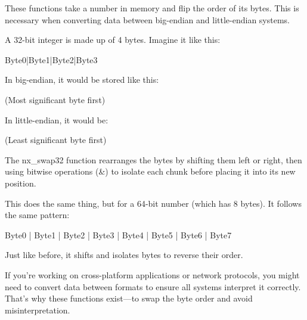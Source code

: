 \begin{NexMainBox}
	\begin{NexMainBox}[dark, crnA, title=\textbf{What Are These Functions Doing?}]
		These functions take a number in memory and flip the order of its bytes. This is necessary when converting data between big-endian and little-endian systems.
	\end{NexMainBox}
	\begin{NexMainBox}[dark, crnA, title=\textbf{How does nx\_swap32 work? (32-bit swap)}]
		A 32-bit integer is made up of 4 bytes. Imagine it like this:
		\begin{NexMainBox}[light, halign=center]
			Byte0\hspace{1em}|\hspace{1em}Byte1\hspace{1em}|\hspace{1em}Byte2\hspace{1em}|\hspace{1em}Byte3
		\end{NexMainBox}
		In big-endian, it would be stored like this:
		\begin{NexMainBox}[light, halign=center]
			[AB] [CD] [EF] [GH] (Most significant byte first)
		\end{NexMainBox}
		In little-endian, it would be:
		\begin{NexMainBox}[light, halign=center]
			[GH] [EF] [CD] [AB] (Least significant byte first)
		\end{NexMainBox}
		The nx\_swap32 function rearranges the bytes by shifting them left or right, then using bitwise operations (\&) to isolate each chunk before placing it into its new position.
	\end{NexMainBox}
	\begin{NexMainBox}[dark, crnA, title=\textbf{How does nx\_swap64 work? (64-bit swap)}]
		This does the same thing, but for a 64-bit number (which has 8 bytes). It follows the same pattern:
		\begin{NexMainBox}[light, halign=center]
			Byte0 | Byte1 | Byte2 | Byte3 | Byte4 | Byte5 | Byte6 | Byte7
		\end{NexMainBox}
		Just like before, it shifts and isolates bytes to reverse their order.
	\end{NexMainBox}
	\begin{NexMainBox}[dark, crnA, title=\textbf{Why Is This Important?}]
		If you're working on cross-platform applications or network protocols, you might need to convert data between formats to ensure all systems interpret it correctly. That’s why these functions exist—to swap the byte order and avoid misinterpretation.
	\end{NexMainBox}
\end{NexMainBox}

